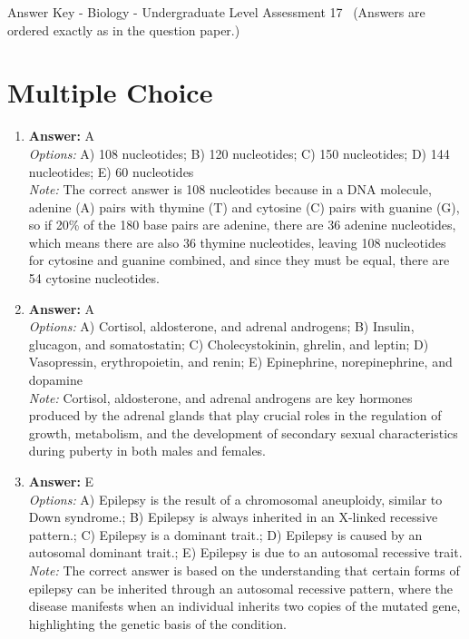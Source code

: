 \documentclass[12pt]{article}
\begin{document}
\begin{center}
Answer Key - Biology - Undergraduate Level Assessment 17 \
\small (Answers are ordered exactly as in the question paper.)
\end{center}

\section*{Multiple Choice}
\begin{enumerate}[label=\arabic*.]
\item \textbf{Answer:} A
\\ \textit{Options:} A) 108 nucleotides; B) 120 nucleotides; C) 150 nucleotides; D) 144 nucleotides; E) 60 nucleotides
\\ \textit{Note:} The correct answer is 108 nucleotides because in a DNA molecule, adenine (A) pairs with thymine (T) and cytosine (C) pairs with guanine (G), so if 20\% of the 180 base pairs are adenine, there are 36 adenine nucleotides, which means there are also 36 thymine nucleotides, leaving 108 nucleotides for cytosine and guanine combined, and since they must be equal, there are 54 cytosine nucleotides.
\item \textbf{Answer:} A
\\ \textit{Options:} A) Cortisol, aldosterone, and adrenal androgens; B) Insulin, glucagon, and somatostatin; C) Cholecystokinin, ghrelin, and leptin; D) Vasopressin, erythropoietin, and renin; E) Epinephrine, norepinephrine, and dopamine
\\ \textit{Note:} Cortisol, aldosterone, and adrenal androgens are key hormones produced by the adrenal glands that play crucial roles in the regulation of growth, metabolism, and the development of secondary sexual characteristics during puberty in both males and females.
\item \textbf{Answer:} E
\\ \textit{Options:} A) Epilepsy is the result of a chromosomal aneuploidy, similar to Down syndrome.; B) Epilepsy is always inherited in an X-linked recessive pattern.; C) Epilepsy is a dominant trait.; D) Epilepsy is caused by an autosomal dominant trait.; E) Epilepsy is due to an autosomal recessive trait.
\\ \textit{Note:} The correct answer is based on the understanding that certain forms of epilepsy can be inherited through an autosomal recessive pattern, where the disease manifests when an individual inherits two copies of the mutated gene, highlighting the genetic basis of the condition.

\end{enumerate}
\end{document}
